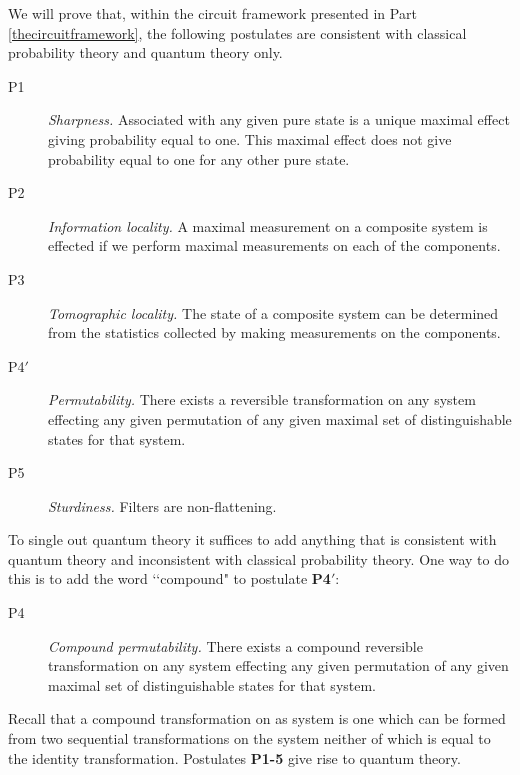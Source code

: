 \documentclass[10pt]{article}
\begin{document}
We will prove that, within the circuit framework presented in Part \ref{thecircuitframework}, the following postulates are consistent with classical probability theory and quantum theory only.
\begin{description}
\item[P1] \emph{Sharpness.}  Associated with any given pure state is a unique maximal effect giving probability equal to one.  This maximal effect does not give probability equal to one for any other pure state.
\item[P2] \emph{Information locality.} A maximal measurement on a composite system is effected if we perform maximal measurements on each of the components.
\item[P3] \emph{Tomographic locality.} The state of a composite system can be determined from the statistics collected by making measurements on the components.
\item[P4$'$] \emph{Permutability.} There exists a reversible transformation on any system effecting any given permutation of any given maximal set of distinguishable states for that system.
\item[P5] \emph{Sturdiness.}  Filters are non-flattening.
\end{description}
To single out quantum theory it suffices to add anything that is consistent with quantum theory and inconsistent with classical probability theory. One way to do this is to add the word \lq\lq compound" to postulate {\bf P4$'$}:
\begin{description}
\item[P4] \emph{Compound permutability.}  There exists a compound reversible transformation on any system effecting any given permutation of any given maximal set of distinguishable states for that system.
\end{description}
Recall that a compound transformation on as system is one which can be formed from two sequential transformations on the system neither of which is equal to the identity transformation.  Postulates {\bf P1-5} give rise to quantum theory.
\end{document}
